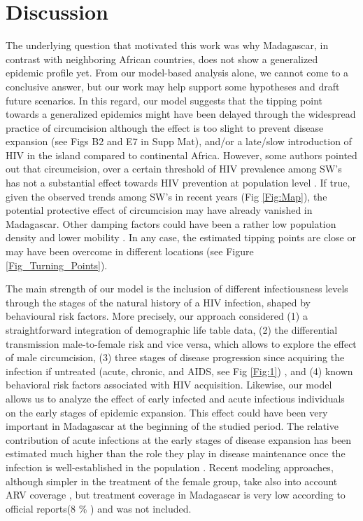 \documentclass[preprint,12pt]{elsarticle}
\begin{document}
\section{Discussion}
 The underlying question that motivated this work was why Madagascar, in contrast with neighboring African countries, does not show a generalized epidemic profile yet. From our model-based analysis alone, we cannot come to a conclusive answer, but our work may help support some hypotheses and draft future scenarios. In this regard, our model suggests that the tipping point towards a generalized epidemics might have been delayed through the widespread practice of circumcision although the effect is too slight to prevent disease expansion (see Figs B2 and E7 in Supp Mat), and/or a late/slow introduction of HIV in the island compared to continental Africa. However, some authors pointed out that circumcision, over a certain threshold of HIV prevalence among SW’s has not a substantial effect towards HIV prevention at population level \cite{Talbott2007}. If true, given the observed trends among SW's in recent years (Fig \ref{Fig:Map}), the potential protective effect of circumcision may have already vanished in Madagascar. Other damping factors could have been a rather low population density and lower mobility \cite{Raberahona2020}. In any case, the estimated tipping points are close or may have been overcome in different locations (see Figure \ref{Fig_Turning_Points}). 
 \smallskip
    
The main strength of our model is the inclusion of different infectiousness levels through the stages of the natural history of a HIV infection, shaped by behavioural risk factors. More precisely, our approach considered (1) a straightforward integration of demographic life table data, (2) the differential transmission male-to-female risk and vice versa, which allows to explore the effect of male circumcision, (3) three stages of disease progression since acquiring the infection if untreated (acute, chronic, and AIDS, see Fig \ref{Fig:1}) , and (4) known behavioral risk factors associated with HIV acquisition. Likewise, our model allows us to analyze the effect of early infected and acute infectious individuals on the early stages of epidemic expansion. This effect could have been very important in Madagascar at the beginning of the studied period. The relative contribution of acute infections at the early stages of disease expansion has been estimated much higher than the role they play in disease maintenance once the infection is well-established in the population \cite{Fiebig2003}. Recent modeling approaches, although simpler in the treatment of the female group, take also into account ARV coverage \cite{Omondi2018,Omondi2019}, but treatment coverage in Madagascar is   very low according to official reports(8 \% \citet{UNAIDS2019}) and was not included. 
\smallskip
 	  
\end{document}
